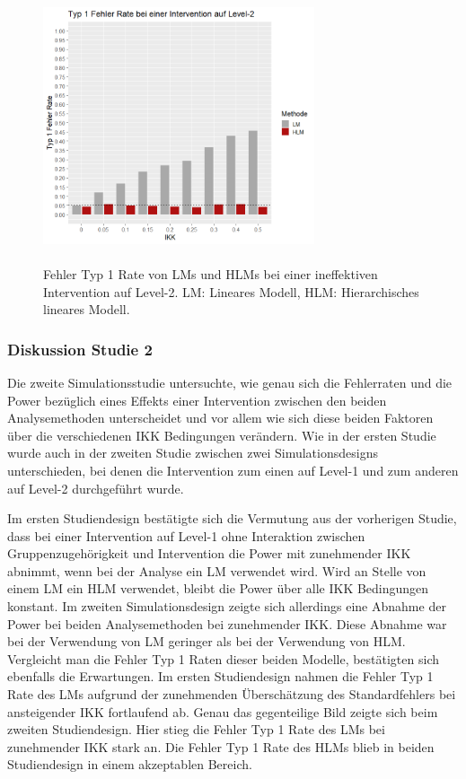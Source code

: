 \documentclass[12pt, a4paper]{article}\usepackage[]{graphicx}\usepackage[]{color}
\begin{document}
\begin{figure}[t!]
\centering
\captionsetup{width=8cm}
\includegraphics[width=8cm, height=8cm]{./figures/results_error_lvl2}
\caption{Fehler Typ 1 Rate von LMs und HLMs bei einer ineffektiven Intervention auf Level-2. LM: Lineares Modell, HLM: Hierarchisches lineares Modell.}
\label{fig:results_error_lvl2}
\end{figure}

\subsubsection{Diskussion Studie 2}
Die zweite Simulationsstudie untersuchte, wie genau sich die Fehlerraten und die Power bezüglich eines Effekts einer Intervention zwischen den beiden Analysemethoden unterscheidet und vor allem wie sich diese beiden Faktoren über die verschiedenen IKK Bedingungen verändern. Wie in der ersten Studie wurde auch in der zweiten Studie zwischen zwei Simulationsdesigns unterschieden, bei denen die Intervention zum einen auf Level-1 und zum anderen auf Level-2 durchgeführt wurde.

Im ersten Studiendesign bestätigte sich die Vermutung aus der vorherigen Studie, dass bei einer Intervention auf Level-1 ohne Interaktion zwischen Gruppenzugehörigkeit und Intervention die Power mit zunehmender IKK abnimmt, wenn bei der Analyse ein LM verwendet wird. Wird an Stelle von einem LM ein HLM verwendet, bleibt die Power über alle IKK Bedingungen konstant. Im zweiten Simulationsdesign zeigte sich allerdings eine Abnahme der Power bei beiden Analysemethoden bei zunehmender IKK. Diese Abnahme war bei der Verwendung von LM geringer als bei der Verwendung von HLM. Vergleicht man die Fehler Typ 1 Raten dieser beiden Modelle, bestätigten sich ebenfalls die Erwartungen. Im ersten Studiendesign nahmen die Fehler Typ 1 Rate des LMs aufgrund der zunehmenden Überschätzung des Standardfehlers bei ansteigender IKK fortlaufend ab. Genau das gegenteilige Bild zeigte sich beim zweiten Studiendesign. Hier stieg die Fehler Typ 1 Rate des LMs bei zunehmender IKK stark an. Die Fehler Typ 1 Rate des HLMs blieb in beiden Studiendesign in einem akzeptablen Bereich. 
\end{document}
